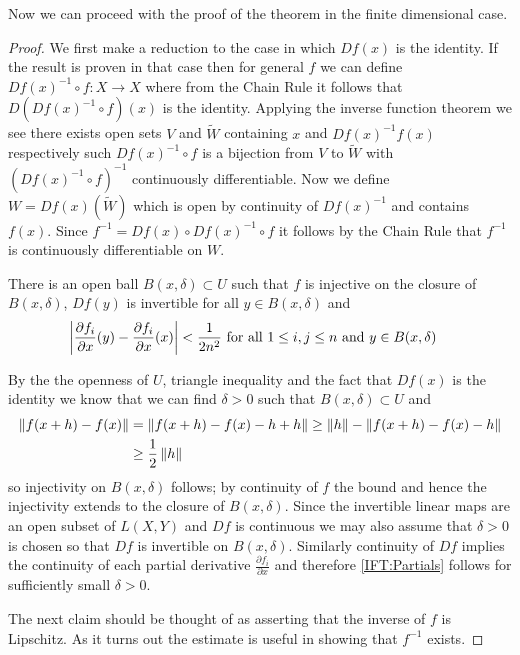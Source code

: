 Now we can proceed with the proof of the theorem in the finite
dimensional case.
\begin{proof}
We first make a reduction to the case in which $Df(x)$ is the
identity.  If the result is proven in that case then for general $f$
we can define $Df(x)^{-1} \circ f : X \to X$ where from the Chain Rule
it follows that
$D(Df(x)^{-1} \circ f)(x)$ is the identity.  Applying the inverse
function theorem we see there exists open
sets $V$ and $\tilde{W}$ containing $x$ and $Df(x)^{-1}  f(x)$ respectively such
$Df(x)^{-1} \circ f$ is a bijection from $V$ to $\tilde{W}$ with $(Df(x)^{-1} \circ f)^{-1}$
continuously differentiable.  Now we define $W = Df(x)(\tilde{W})$
which is open by continuity of $Df(x)^{-1}$ and contains $f(x)$.
Since $f^{-1} = Df(x) \circ Df(x)^{-1} \circ f$ it follows by the
Chain Rule that $f^{-1}$ is continuously differentiable on $W$.

\begin{clm}There is an open ball $B(x, \delta) \subset U$ such that $f$ is
injective on the closure of $B(x, \delta)$, $Df(y)$ is invertible for all $y \in B(x,
\delta)$ and 
\begin{align}
\left \vert \frac{\partial f_i}{\partial x}(y) - \frac{\partial
    f_i}{\partial x}(x) \right \vert 
&< \frac{1}{2n^2} \text{ for all $1 \leq i,j \leq n$ and $y \in
  B(x,\delta)$}
\end{align}\label{IFT:Partials}
\end{clm}

By the the openness of $U$, triangle inequality and the fact that $Df(x)$ is the
identity we know that we can find $\delta > 0$
such that $B(x,\delta) \subset U$ and 
\begin{align*}
\left \lVert f(x+h) - f(x) \right \rVert &= \left \lVert f(x+h) - f(x) - h + h \right \rVert \geq \left \lVert h \right \rVert -
                       \left \lVert f(x+h) - f(x) - h \right \rVert \\
&\geq \frac{1}{2}\left \lVert h \right \rVert
\end{align*}
so injectivity on $B(x, \delta)$ follows; by continuity of $f$ the
bound and hence the injectivity extends to the closure of $B(x,\delta)$.  Since the invertible linear maps are an open
subset of $L(X,Y)$ and $Df$ is continuous we may also assume that
$\delta > 0$ is chosen so that $Df$ is invertible on $B(x,\delta)$.
Similarly continuity of $Df$ implies the continuity of each partial
derivative $\frac{\partial f_i}{\partial x}$ and therefore
\eqref{IFT:Partials} follows for sufficiently small $\delta > 0$.

The next claim should be thought of as asserting that the inverse of
$f$ is Lipschitz.  As it turns out the estimate is useful in showing
that $f^{-1}$ exists.


\end{proof}
